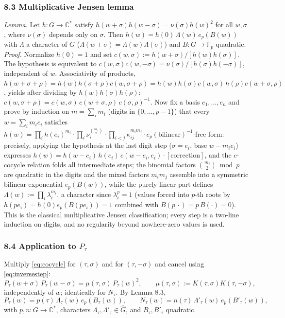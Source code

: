 \documentclass[11pt]{article}
\begin{document}
\subsubsection*{8.3 Multiplicative Jensen lemma}

\emph{Lemma.} Let $h:G\to\mathbb{C}^*$ satisfy
$h(w+\sigma)h(w-\sigma)=\nu(\sigma)h(w)^2$ for all $w,\sigma$, where
$\nu(\sigma)$ depends only on $\sigma$. Then
$h(w)=h(0)\,\Lambda(w)\,e_p(B(w))$ with $\Lambda$ a character of $G$
($\Lambda(w+\sigma)=\Lambda(w)\Lambda(\sigma)$) and $B:G\to\mathbb{F}_p$
quadratic.
\emph{Proof.} Normalize $h(0)=1$ and set
$c(w,\sigma):=h(w+\sigma)/[h(w)h(\sigma)]$. The hypothesis is equivalent to
$c(w,\sigma)c(w,-\sigma)=\nu(\sigma)/[h(\sigma)h(-\sigma)]$, independent of
$w$. Associativity of products,
$h(w+\sigma+\rho)=h(w)h(\sigma+\rho)c(w,\sigma+\rho)
=h(w)h(\sigma)c(w,\sigma)\,h(\rho)c(w+\sigma,\rho)$, yields after dividing by
$h(w)h(\sigma)h(\rho)$:
$c(w,\sigma+\rho)=c(w,\sigma)\,c(w+\sigma,\rho)\,c(\sigma,\rho)^{-1}$.
Now fix a basis $e_1,\dots,e_n$ and prove by induction on
$m=\sum_i m_i$ (digits in $\{0,\dots,p-1\}$) that every $w=\sum_i m_ie_i$
satisfies
$h(w)=\prod_i h(e_i)^{m_i}\cdot\prod_i \nu_i^{\binom{m_i}{2}}
\cdot\prod_{i<j}\kappa_{ij}^{m_im_j}\cdot e_p(\text{bilinear})^{-1}$-free
form: precisely, applying the hypothesis at the last digit step
($\sigma=e_i$, base $w-m_ie_i$) expresses
$h(w)=h(w-e_i)\,h(e_i)\,c(w-e_i,e_i)\cdot[\text{correction}]$, and the
$c$-cocycle relation folds all intermediate steps; the binomial factors
$\binom{m_i}{2}\bmod p$ are quadratic in the digits and the mixed factors
$m_im_j$ assemble into a symmetric bilinear exponential
$e_p(B(w))$, while the purely linear part defines
$\Lambda(w):=\prod_i\lambda_i^{m_i}$, a character since
$\lambda_i^{p}=1$ (values forced into $p$-th roots by
$h(pe_i)=h(0)e_p(B(pe_i))=1$ combined with $B(p\,\cdot)=p\,B(\cdot)=0$).
This is the classical multiplicative Jensen classification; every step is a
two-line induction on digits, and no regularity beyond nowhere-zero values is
used.

\subsubsection*{8.4 Application to $P_\tau$}

Multiply \eqref{eq:cocycle} for $(\tau,\sigma)$ and for $(\tau,-\sigma)$ and
cancel using \eqref{eq:inversestep}:
\[
P_\tau(w+\sigma)\,P_\tau(w-\sigma)=\mu(\tau,\sigma)\,P_\tau(w)^2,
\qquad \mu(\tau,\sigma):=K(\tau,\sigma)K(\tau,-\sigma),
\]
independently of $w$; identically for $N_\tau$. By Lemma 8.3,
\[
P_\tau(w)=p(\tau)\,\Lambda_\tau(w)\,e_p(B_\tau(w)),\qquad
N_\tau(w)=n(\tau)\,\Lambda'_\tau(w)\,e_p(B'_\tau(w)),
\]
with $p,n:\!G\to\mathbb{C}^*$, characters
$\Lambda_\tau,\Lambda'_\tau\in\widehat G$, and $B_\tau,B'_\tau$ quadratic.
\end{document}
